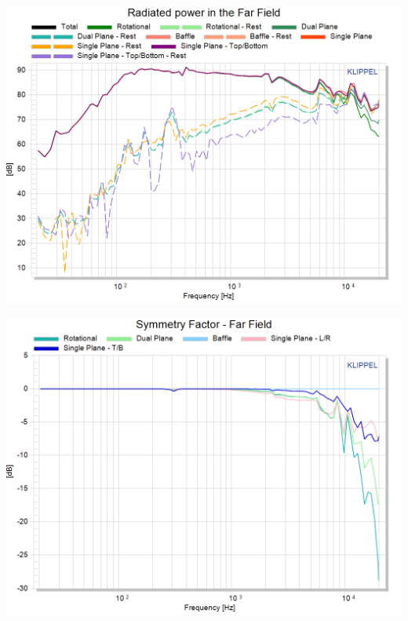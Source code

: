 \documentclass{report}
\begin{document}
\begin{minipage}{0.5\textwidth}
\begin{center}
	\includegraphics[width=.9\textwidth]{Sym/Rad_Pow_10cmWoofer} 
    \captionsetup{hypcap=false} 
	\label{fig:rad_pow_10cm}
\end{center}
\end{minipage}
\begin{minipage}{0.5\textwidth}
\begin{center}
	\includegraphics[width=.9\textwidth]{Sym/Sym_Fact_10cmWoofer} 
    \captionsetup{hypcap=false} 
	\label{fig:sym_fact_10cm}
\end{center}
\end{minipage}
\vspace{0.1cm}
\end{document}
